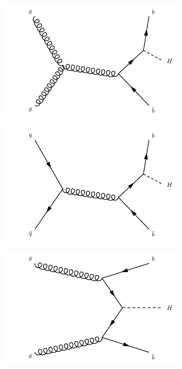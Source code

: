 \begin{figure}
\centering
\begin{subfigure}[b]{0.22\textwidth}
  \centering
  \includegraphics[width=\textwidth]{Images/bbh1.pdf}
  \caption{\label{fig:bbh1}}
\end{subfigure}%
\begin{subfigure}[b]{0.22\textwidth}
  \centering
  \includegraphics[width=\textwidth]{Images/bbh2.pdf}
  \caption{\label{fig:bbh2}}
\end{subfigure}%
\begin{subfigure}[b]{0.22\textwidth}
  \centering
  \includegraphics[width=\textwidth]{Images/bbh3.pdf}

\end{subfigure}
\end{figure}
